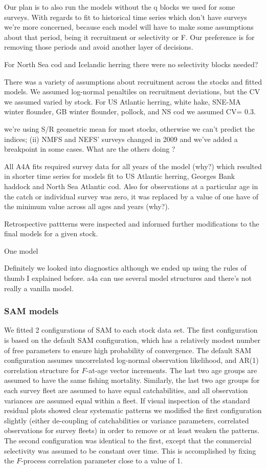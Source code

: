 \documentclass[12pt,letterpaper, leqno]{article}
\begin{document}
Our plan is to also run the models without the q blocks we used for some surveys. With regards to fit to historical time series which don't have surveys we're more concerned, because each model will have to make some assumptions about that period, being it recruitment or selectivity or F. Our preference is for removing those periods and avoid another layer of decisions.

For North Sea cod and Icelandic herring there were no selectivity blocks needed?

There was a variety of assumptions about recruitment across the stocks and fitted models.
We assumed log-normal penaltiles on recruitment deviations, but the CV we assumed varied by stock. For US Atlantic herring, white hake, SNE-MA winter flounder, GB winter flounder, pollock, and NS cod we assumed CV= 0.3.

we're using S/R geometric mean for most stocks, otherwise we can't predict the indices; (ii) NMFS and NEFS' surveys changed in 2009 and we've added a breakpoint in some cases. What are the others doing ?


All A4A fits required survey data for all years of the model (why?) which resulted in shorter time series for models fit to US Atlantic herring, Georges Bank haddock and North Sea Atlantic cod. Also for observations at a particular age in the catch or individual survey was zero, it was replaced by a value of one have of the minimum value across all ages and years (why?).

Retrospective pattterns were inspected and informed further modifications to the final models for a given stock.

One model 

Definitely we looked into diagnostics although we ended up using the rules of thumb I explained before. a4a can use several model structures and there's not really a vanilla model.

\subsubsection*{SAM models}

We fitted 2 configurations of SAM to each stock data set. The first configuration is based on the default SAM configuration, which has a relatively modest number of free parameters to ensure high probability of convergence. The default SAM configuration assumes uncorrelated log-normal observation likelihood, and AR(1) correlation structure for $F$-at-age vector increments. The last two age groups are assumed to have the same fishing mortality. Similarly, the last two age groups for each survey fleet are assumed to have equal catchabilities, and all observation variances are assumed equal within a fleet. If visual inspection of the standard residual plots showed clear systematic patterns we modified the first configuration slightly (either de-coupling of catchabilities or variance parameters, correlated observations for survey fleets) in order to remove or at least weaken the patterns.
The second configuration was identical to the first, except that the commercial selectivity was assumed to be constant over time. This is accomplished by fixing the $F$-process correlation parameter close to a value of 1.
\end{document}
